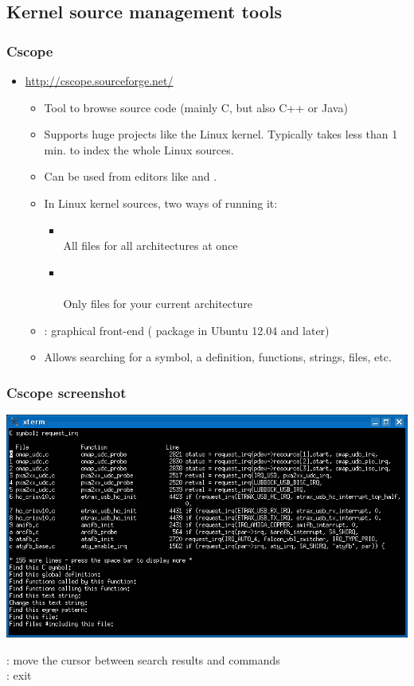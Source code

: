 \subsection{Kernel source management tools}

\begin{frame}
  \frametitle{Cscope}
  \begin{itemize}
  \item \url{http://cscope.sourceforge.net/}
    \begin{itemize}
    \item Tool to browse source code (mainly C, but also C++ or Java)
    \item Supports huge projects like the Linux kernel. Typically takes less
      than 1 min. to index the whole Linux sources.
    \item Can be used from editors like  and .
    \item In Linux kernel sources, two ways of running it:
      \begin{itemize}
      \item {}\\
        All files for all architectures at once
      \item {}\\
        \\
        Only files for your current architecture
      \end{itemize}
    \item {}: graphical front-end
      ( package in Ubuntu 12.04 and later)
    \item Allows searching for a symbol, a definition, functions,
      strings, files, etc.
    \end{itemize}
  \end{itemize}
\end{frame}

\begin{frame}
  \frametitle{Cscope screenshot}
  \begin{center}
    \includegraphics[width=\textwidth]{slides/kernel-source-code-management/cscope.png}
  \end{center}
  \code{[Tab]}: move the cursor between search results and commands\\
  \code{[Ctrl] [D]}: exit 
\end{frame}

